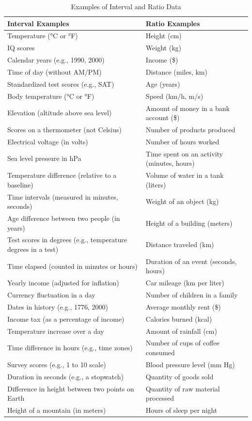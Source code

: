 \documentclass[12pt,a4paper]{book}
\begin{document}
\begin{table}[h!]
\centering
\begin{tabular}{|p{8cm}|p{8cm}|}
\hline
\textbf{Interval Examples} & \textbf{Ratio Examples} \\
\hline
Temperature (°C or °F) & Height (cm) \\
IQ scores & Weight (kg) \\
Calendar years (e.g., 1990, 2000) & Income (\$) \\
Time of day (without AM/PM) & Distance (miles, km) \\
Standardized test scores (e.g., SAT) & Age (years) \\
Body temperature (°C or °F) & Speed (km/h, m/s) \\
Elevation (altitude above sea level) & Amount of money in a bank account (\$) \\
Scores on a thermometer (not Celsius) & Number of products produced \\
Electrical voltage (in volts) & Number of hours worked \\
Sea level pressure in hPa & Time spent on an activity (minutes, hours) \\
Temperature difference (relative to a baseline) & Volume of water in a tank (liters) \\
Time intervals (measured in minutes, seconds) & Weight of an object (kg) \\
Age difference between two people (in years) & Height of a building (meters) \\
Test scores in degrees (e.g., temperature degrees in a test) & Distance traveled (km) \\
Time elapsed (counted in minutes or hours) & Duration of an event (seconds, hours) \\
Yearly income (adjusted for inflation) & Car mileage (km per liter) \\
Currency fluctuation in a day & Number of children in a family \\
Dates in history (e.g., 1776, 2000) & Average monthly rent (\$) \\
Income tax (as a percentage of income) & Calories burned (kcal) \\
Temperature increase over a day & Amount of rainfall (cm) \\
Time difference in hours (e.g., time zones) & Number of cups of coffee consumed \\
Survey scores (e.g., 1 to 10 scale) & Blood pressure level (mm Hg) \\
Duration in seconds (e.g., a stopwatch) & Quantity of goods sold \\
Difference in height between two points on Earth & Quantity of raw material processed \\
Height of a mountain (in meters) & Hours of sleep per night \\
\hline
\end{tabular}
\caption{Examples of Interval and Ratio Data}
\end{table}
\end{document}
